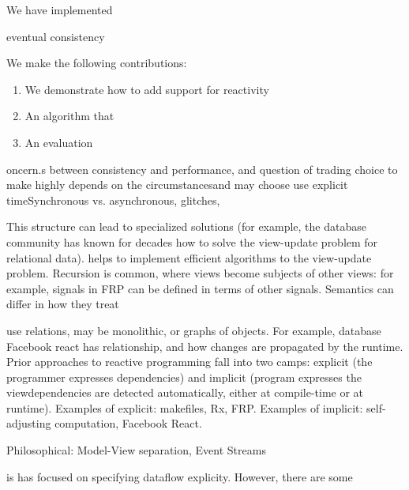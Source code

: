 We have implemented

eventual consistency
 
 We make the following contributions:
 
 
 \begin{enumerate}
 \item We demonstrate how to add support for reactivity 
 \item  An algorithm that
 \item An evaluation
 \end{enumerate}
 
 
     
   
 
\hidden
{
oncern.s between consistency and performance, and question of trading  choice to make highly depends on the circumstancesand may choose use explicit timeSynchronous vs. asynchronous, glitches, 
 
This structure can lead to specialized solutions (for example, the database community has known for decades how to solve the view-update problem for relational data). helps to implement efficient algorithms  to the view-update problem. Recursion is common, where views become subjects of other views: for example, signals in FRP can be defined in terms of other signals. Semantics can differ in how they treat 


use relations, may be monolithic, or graphs of objects. For example, database Facebook react has 
relationship, and how changes are propagated by the runtime. Prior approaches to reactive programming fall into two camps: explicit (the programmer expresses dependencies) and implicit (program expresses the viewdependencies are detected automatically, either at compile-time or at runtime).
Examples of explicit: makefiles, Rx, FRP. Examples of implicit: self-adjusting computation, Facebook React.

Philosophical: Model-View separation, Event Streams

  is has focused on specifying dataflow explicity. However, there are some 
}

